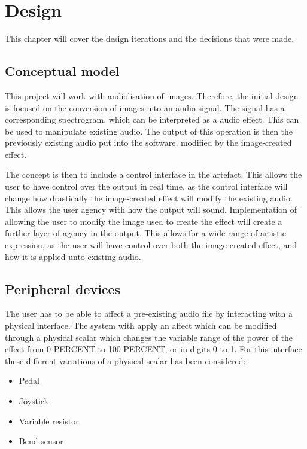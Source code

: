 \chapter{Design}\label{ch:design}
This chapter will cover the design iterations and the decisions that were made. 

\section{Conceptual model}
This project will work with audiolisation of images. Therefore, the initial design is focused on the conversion of images into an audio signal. The signal has a corresponding spectrogram, which can be interpreted as a audio effect. This can be used to manipulate existing audio. The output of this operation is then the previously existing audio put into the software, modified by the image-created effect.

The concept is then to include a control interface in the artefact. This allows the user to have control over the output in real time, as the control interface will change how drastically the image-created effect will modify the existing audio. This allows the user agency with how the output will sound. Implementation of allowing the user to modify the image used to create the effect will create a further layer of agency in the output. This allows for a wide range of artistic expression, as the user will have control over both the image-created effect, and how it is applied unto existing audio.

\section{Peripheral devices}
The user has to be able to affect a pre-existing audio file by interacting with a physical interface. The system with apply an affect which can be modified through a physical scalar which changes the variable range of the power of the effect from 0 PERCENT to 100 PERCENT, or in digits 0 to 1. For this interface these different variations of a physical scalar has been considered: 

\begin{itemize}
\item Pedal
\item Joystick
\item Variable resistor
\item Bend sensor
\end{itemize}


